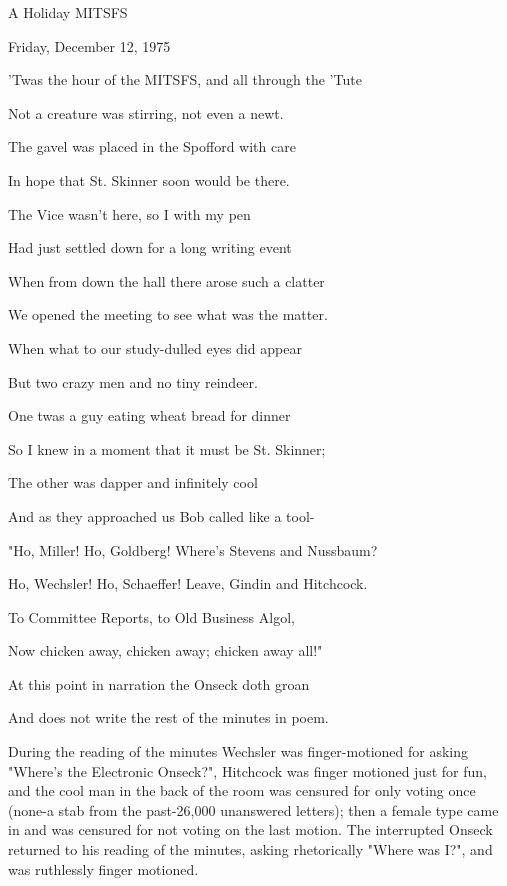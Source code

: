 \documentclass[12pt]{article}
\begin{document}
\begin{center}

A Holiday MITSFS

Friday, December 12, 1975

\end{center}
 
\vspace{12pt}

\setlength{\parskip}{6pt}

\noindent
'Twas the hour of the MITSFS, and all through the 'Tute

Not a creature was stirring, not even a newt.

The gavel was placed in the Spofford with care

In hope that St. Skinner soon would be there.

The Vice wasn't here, so I with my pen

Had just settled down for a long writing event

When from down the hall there arose such a clatter

We opened the meeting to see what was the matter.

When what to our study-dulled eyes did appear

But two crazy men and no tiny reindeer.

One twas a guy eating wheat bread for dinner

So I knew in a moment that it must be St. Skinner;

The other was dapper and infinitely cool

And as they approached us Bob called like a tool-

"Ho, Miller! Ho, Goldberg! Where's Stevens and Nussbaum?

Ho, Wechsler! Ho, Schaeffer! Leave, Gindin and Hitchcock.

To Committee Reports, to Old Business Algol,

Now chicken away, chicken away; chicken away all!"

At this point in narration the Onseck doth groan

And does not write the rest of the minutes in poem.

During the reading of the minutes Wechsler was finger-motioned for asking "Where's the Electronic Onseck?", Hitchcock was finger motioned just for fun, and the cool man in the back of the room was censured for only voting once (none-a stab from the past-26,000 unanswered letters); then a female type came in and was censured for not voting on the last motion. The interrupted Onseck returned to his reading of the minutes, asking rhetorically "Where was I?", and was ruthlessly finger motioned.
\end{document}
